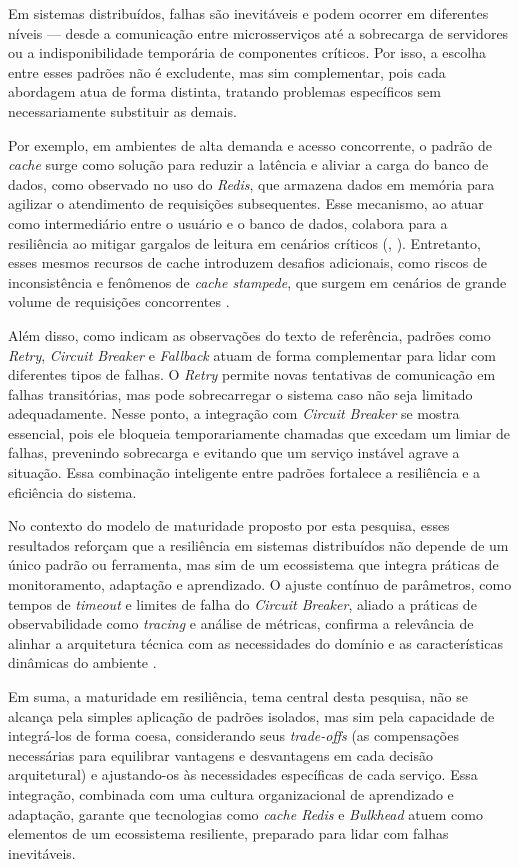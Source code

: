 Em sistemas distribuídos, falhas são inevitáveis e podem ocorrer em diferentes níveis — desde a comunicação entre microsserviços até a sobrecarga de servidores ou a indisponibilidade temporária de componentes críticos. Por isso, a escolha entre esses padrões não é excludente, mas sim complementar, pois cada abordagem atua de forma distinta, tratando problemas específicos sem necessariamente substituir as demais.

Por exemplo, em ambientes de alta demanda e acesso concorrente, o padrão de \textit{cache} surge como solução para reduzir a latência e aliviar a carga do banco de dados, como observado no uso do \textit{Redis}, que armazena dados em memória para agilizar o atendimento de requisições subsequentes. Esse mecanismo, ao atuar como intermediário entre o usuário e o banco de dados, colabora para a resiliência ao mitigar gargalos de leitura em cenários críticos (\citeauthor{Kanthed2023}, \citeyear{Kanthed2023}). Entretanto, esses mesmos recursos de cache introduzem desafios adicionais, como riscos de inconsistência e fenômenos de \textit{cache stampede}, que surgem em cenários de grande volume de requisições concorrentes \citep{falkevych2023}.

Além disso, como indicam as observações do texto de referência, padrões como \textit{Retry}, \textit{Circuit Breaker} e \textit{Fallback} atuam de forma complementar para lidar com diferentes tipos de falhas. O \textit{Retry} permite novas tentativas de comunicação em falhas transitórias, mas pode sobrecarregar o sistema caso não seja limitado adequadamente. Nesse ponto, a integração com \textit{Circuit Breaker} se mostra essencial, pois ele bloqueia temporariamente chamadas que excedam um limiar de falhas, prevenindo sobrecarga e evitando que um serviço instável agrave a situação. Essa combinação inteligente entre padrões fortalece a resiliência e a eficiência do sistema.

No contexto do modelo de maturidade proposto por esta pesquisa, esses resultados reforçam que a resiliência em sistemas distribuídos não depende de um único padrão ou ferramenta, mas sim de um ecossistema que integra práticas de monitoramento, adaptação e aprendizado. O ajuste contínuo de parâmetros, como tempos de \textit{timeout} e limites de falha do \textit{Circuit Breaker}, aliado a práticas de observabilidade como \textit{tracing} e análise de métricas, confirma a relevância de alinhar a arquitetura técnica com as necessidades do domínio e as características dinâmicas do ambiente \citep{Newman:15:MS, kostenko2023antifragile}.

Em suma, a maturidade em resiliência, tema central desta pesquisa, não se alcança pela simples aplicação de padrões isolados, mas sim pela capacidade de integrá-los de forma coesa, considerando seus \textit{trade-offs} (as compensações necessárias para equilibrar vantagens e desvantagens em cada decisão arquitetural) e ajustando-os às necessidades específicas de cada serviço. Essa integração, combinada com uma cultura organizacional de aprendizado e adaptação, garante que tecnologias como \textit{cache Redis} e \textit{Bulkhead} atuem como elementos de um ecossistema resiliente, preparado para lidar com falhas inevitáveis.

